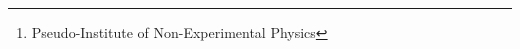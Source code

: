 \newcommand{\authorname}{Reivax Del Ponte}
\newcommand{\institute}{Pseudo-Institute of Non-Experimental Physics}
\author{\authorname \thanks{\institute}}
